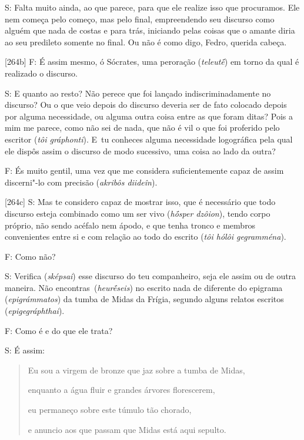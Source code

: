  

S: Falta muito ainda, ao que parece, para que ele realize isso que
procuramos. Ele nem começa pelo começo, mas pelo final, empreendendo seu
discurso como alguém que nada de costas e para trás, iniciando pelas
coisas que o amante diria ao seu predileto somente no final. Ou não é
como digo, Fedro, querida cabeça.

 

[264b] F: É assim mesmo, ó Sócrates, uma peroração (\emph{teleutḗ})
em torno da qual é realizado o discurso.

 

S: E quanto ao resto? Não perece que foi lançado indiscriminadamente no
discurso? Ou o que veio depois do discurso deveria ser de fato colocado
depois por alguma necessidade, ou alguma outra coisa entre as que foram
ditas? Pois a mim me parece, como não sei de nada, que não é vil o que
foi proferido pelo escritor (\emph{tôi gráphonti}). E~tu conheces alguma
necessidade logográfica pela qual ele dispôs assim o discurso de modo
sucessivo, uma coisa ao lado da outra?

 

F: És muito gentil, uma vez que me considera suficientemente capaz de
assim discerni"-lo com precisão (\emph{akribôs diideîn}).

 

[264c] S: Mas te considero capaz de mostrar isso, que é necessário
que todo discurso esteja combinado como um ser vivo (\emph{hṓsper
dzôion}), tendo corpo próprio, não sendo acéfalo nem ápodo, e que tenha
tronco e membros convenientes entre si e com relação ao todo do escrito
(\emph{tôi hólôi gegramména}).

 

F: Como não?

 

S: Verifica (\emph{sképsai}) esse discurso do teu companheiro, seja ele
assim ou de outra maneira. Não encontras\emph{~}(\emph{heurḗseis}) no
escrito nada de diferente do epigrama (\emph{epigrámmatos}) da tumba de
Midas da Frígia, segundo alguns relatos escritos
(\emph{epigegráphthai}).

 

F: Como é e do que ele trata?

 

S: É assim:

 

\begin{quote}
Eu sou a virgem de bronze que jaz sobre a tumba de Midas,

enquanto a água fluir e grandes árvores florescerem,

eu permaneço sobre este túmulo tão chorado,

e anuncio aos que passam que Midas está aqui sepulto.
\end{quote}

